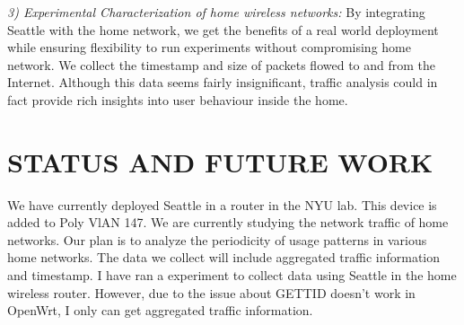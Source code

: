 \documentclass[conference]{IEEEtran}   	%
\begin{document}
\textit{3) Experimental Characterization of home wireless networks: } By integrating Seattle with the home network, we get the benefits of a real world deployment while ensuring flexibility to run experiments without compromising home network. We collect the timestamp and size of packets flowed to and from the Internet. Although this data seems fairly insignificant, traffic analysis could in fact provide rich insights into user behaviour inside the home. 

\section{STATUS AND FUTURE WORK}
We have currently deployed Seattle in a router in the NYU lab. This device is added to Poly VlAN 147. We are currently studying the network traffic of home networks. Our plan is to analyze
the periodicity of usage patterns in various home networks. The data we collect will include aggregated traffic information and timestamp. I have ran a experiment to collect data using Seattle in the home wireless router. However, due to the issue\cite{gettid_issue} about GETTID doesn't work in OpenWrt, I only can get aggregated traffic information. 





\end{document}
